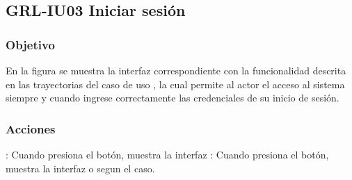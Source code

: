 \clearpage
\subsection{GRL-IU03 Iniciar sesión}

\subsubsection{Objetivo}
En la figura  se muestra la interfaz correspondiente con la funcionalidad descrita en las
trayectorias del caso de uso  , la cual permite al actor el acceso al sistema
siempre y cuando ingrese correctamente las credenciales de su inicio de sesión.

\subsubsection{Acciones}


\Titem {} : Cuando presiona el botón, muestra la interfaz %
\Titem {} : Cuando presiona el botón, muestra la interfaz  o  segun el caso.



\clearpage
